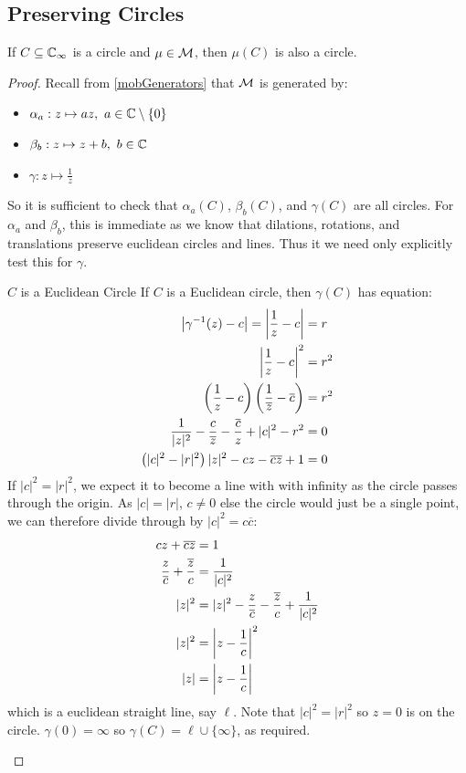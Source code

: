 \documentclass[../main.tex]{subfiles}
\begin{document}
\subsection{Preserving Circles}
\begin{theorem}
  If $C \subseteq \mathbb{C}_{\infty}$ is a circle and $\mu \in \mathcal{M}$, then $\mu(C)$ is also a circle.
\end{theorem}
\begin{proof}
  Recall from \cref{mobGenerators} that $\mathcal{M}$ is generated by:
  \begin{itemize}
    \item $\alpha_a : z \mapsto az,\ a \in \mathbb{C} \setminus \{0\}$
    \item $\beta_b: z \mapsto z + b,\ b \in \mathbb{C}$
    \item $\gamma: z \mapsto \frac{1}{z}$
  \end{itemize}
  So it is sufficient to check that $\alpha_a(C)$, $\beta_b(C)$, and $\gamma(C)$ are all circles.
  For $\alpha_a$ and $\beta_b$, this is immediate as we know that dilations, rotations, and translations preserve euclidean circles and lines.
  Thus it we need only explicitly test this for $\gamma$.
  \begin{proofcases}
    \begin{case}{$C$ is a Euclidean Circle}
      If $C$ is a Euclidean circle, then $\gamma(C)$ has equation:
      \begin{align*}
        \left\lvert \gamma^{-1}(z) - c \right\rvert = \left\lvert \frac{1}{z} - c \right\rvert &= r \\
        \left\lvert \frac{1}{z} - c \right\rvert^2 &= r^2 \\
        \left(\frac{1}{z} - c\right)\left(\frac{1}{\overline{z}} - \overline{c}\right) &= r^2 \\
        \frac{1}{|z|^2} - \frac{c}{\overline{z}} - \frac{\overline{c}}{z} + |c|^2 -r^2 &= 0 \\
        \left(|c|^2 - |r|^2\right)|z|^2 - cz - \overline{c}\overline{z} + 1 &= 0
      \end{align*}
      If $|c|^2 = |r|^2$, we expect it to become a line with with infinity as the circle passes through the origin.
      As $|c| = |r|$, $c \neq 0$ else the circle would just be a single point, we can therefore divide through by $|c|^2 = c \overline{c}$:
      \begin{align*}
        cz + \overline{c}\overline{z} &= 1 \\
        \frac{z}{\overline{c}} + \frac{\overline{z}}{c} &= \frac{1}{|c|^2} \\
        |z|^2 &= |z|^2 - \frac{z}{\overline{c}} - \frac{\overline{z}}{c} + \frac{1}{|c|^2} \\
        |z|^2 &= \left\lvert z - \frac{1}{c} \right\rvert^2 \\
        |z| &= \left\lvert z - \frac{1}{c} \right\rvert
      \end{align*}
      which is a euclidean straight line, say $\ell$.
      Note that $|c|^2 = |r|^2$ so $z = 0$ is on the circle.
      $\gamma(0) = \infty$ so $\gamma(C) = \ell \cup \{\infty\}$, as required.


\end{case}
\end{proofcases}
\end{proof}
\end{document}
